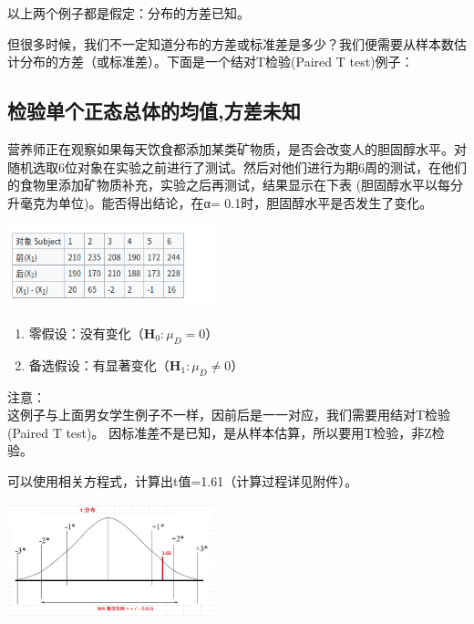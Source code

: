以上两个例子都是假定：分布的方差已知。

但很多时候，我们不一定知道分布的方差或标准差是多少？我们便需要从样本数估计分布的方差（或标准差）。下面是一个结对T检验(Paired
T test)例子：

\hypertarget{ux68c0ux9a8cux5355ux4e2aux6b63ux6001ux603bux4f53ux7684ux5747ux503cux65b9ux5deeux672aux77e5}{%
\subsection{检验单个正态总体的均值,方差未知}\label{ux68c0ux9a8cux5355ux4e2aux6b63ux6001ux603bux4f53ux7684ux5747ux503cux65b9ux5deeux672aux77e5}}

营养师正在观察如果每天饮食都添加某类矿物质，是否会改变人的胆固醇水平。对随机选取6位对象在实验之前进行了测试。然后对他们进行为期6周的测试，在他们的食物里添加矿物质补充，实验之后再测试，结果显示在下表
(胆固醇水平以每分升毫克为单位)。能否得出结论，在α=
0.1时，胆固醇水平是否发生了变化。


\includegraphics[width=6cm]{Screenshotfrom2023-11-1003-41-55.png}

\begin{enumerate}
\tightlist
\item
  零假设：没有变化（\(\mathbf{H}_0: \mu _D = 0\)）
\item
  备选假设：有显著变化（\(\mathbf{H}_1: \mu _D \neq 0\)）
\end{enumerate}

注意：\\
这例子与上面男女学生例子不一样，因前后是一一对应，我们需要用结对T检验
(Paired T test)。
因标准差不是已知，是从样本估算，所以要用T检验，非Z检验。

可以使用相关方程式，计算出t值=1.61（计算过程详见附件）。


\includegraphics[width=6cm]{CholesterolEg2022-07-23_195121.jpg}


